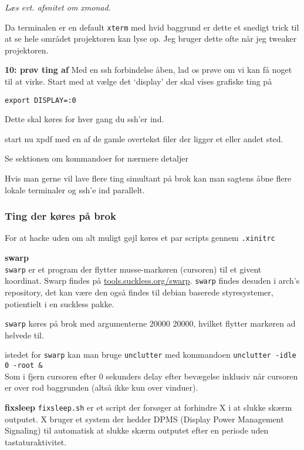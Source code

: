 \documentclass[10pt,a4paper,danish]{article}
\begin{document}
\textit{Læs evt. afsnitet om xmonad.}

Da terminalen er en default \texttt{xterm} med hvid baggrund er dette et snedigt trick
til at se hele området projektoren kan lyse op.
Jeg bruger dette ofte når jeg tweaker projektoren.



\textbf{10: prøv ting af}
Med en ssh forbindelse åben, lad os prøve om vi kan få noget til at virke.
Start med at vælge det `display' der skal vises grafiske ting på
\begin{verbatim}
export DISPLAY=:0
\end{verbatim}
Dette skal køres for hver gang du ssh'er ind.

start nu xpdf med en af de gamle overtekst filer der ligger et eller andet sted.

Se sektionen om kommandoer for nærmere detaljer

Hvis man gerne vil lave flere ting simultant på brok kan man sagtens åbne flere
lokale terminaler og ssh'e ind parallelt.




\subsubsection{Ting der køres på brok}
For at hacke uden om alt muligt gøjl køres et par scripts gennem
\texttt{.xinitrc}

\textbf{swarp}\\
\texttt{swarp} er et program der flytter musse-markøren (cursoren) til et givent koordinat.
Swarp findes på \url{tools.suckless.org/swarp}.
\texttt{swarp} findes desuden i arch's repository, det kan være den også findes til
debian baserede styresystemer, potientielt i en suckless pakke.

\texttt{swarp} køres på brok med argumenterne 20000 20000, hvilket flytter
markøren ad helvede til.

istedet for \texttt{swarp} kan man bruge \texttt{unclutter}
med kommandoen \texttt{unclutter -idle 0 -root \&}\\
Som i fjern cursoren efter 0 sekunders delay efter bevægelse inklusiv når
cursoren er over rod baggrunden (altså ikke kun over vinduer).

\textbf{fixsleep}
\texttt{fixsleep.sh} er et script der forsøger at forhindre X i at slukke skærm outputet.
X bruger et system der hedder DPMS (Display Power Management Signaling) til
automatisk at slukke skærm outputet efter en periode uden tastaturaktivitet.
\end{document}
